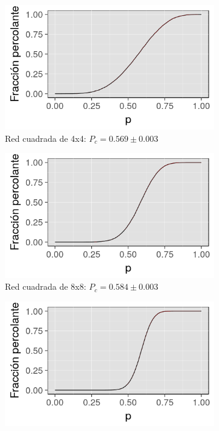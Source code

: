 \documentclass[%
 reprint,
 amsmath,amssymb,
 aps,
spanish]{revtex4-1}
\begin{document}
\begin{figure}[h]
\begin{subfigure}{.25\textwidth}
  \centering
  \includegraphics[width=.9\linewidth]{ej1b/4x4}
  \caption{Red cuadrada de 4x4: $P_c=0.569\pm0.003$}
  \label{fig:1ahist}
\end{subfigure}%
\begin{subfigure}{.25\textwidth}
  \centering
  \includegraphics[width=.9\linewidth]{ej1b/8x8}
  \caption{Red cuadrada de 8x8: $P_c=0.584\pm0.003$}
  \label{fig:1ahist}
\end{subfigure}
\begin{subfigure}{.25\textwidth}
  \centering
  \includegraphics[width=.9\linewidth]{ej1b/16x16}

\end{subfigure}
\end{figure}
\end{document}
